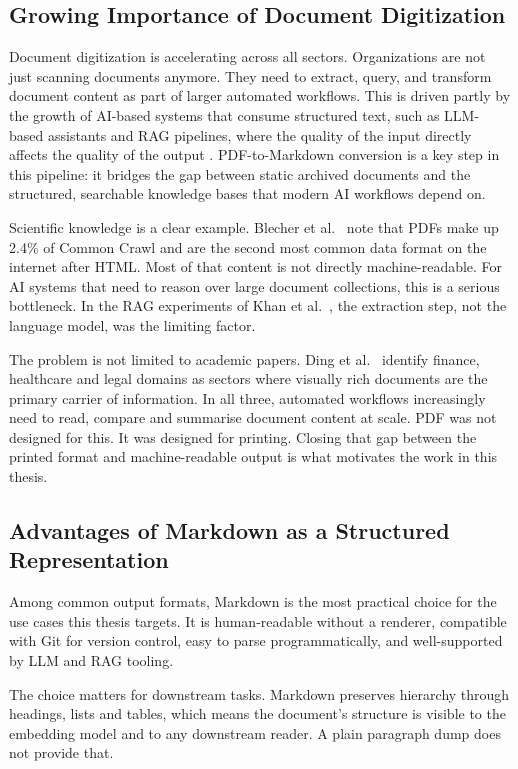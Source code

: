 \subsection{Growing Importance of Document Digitization}

Document digitization is accelerating across all sectors. Organizations are
not just scanning documents anymore. They need to extract, query, and
transform document content as part of larger automated workflows. This is
driven partly by the growth of AI-based systems that consume structured text,
such as LLM-based assistants and RAG pipelines, where the quality of the
input directly affects the quality of the output \autocite{khan2024}.
PDF-to-Markdown conversion is a key step in this pipeline: it bridges the
gap between static archived documents and the structured, searchable
knowledge bases that modern AI workflows depend on.

Scientific knowledge is a clear example. Blecher et al.\ \autocite{blecher2023}
note that PDFs make up 2.4\% of Common Crawl and are the second most
common data format on the internet after HTML. Most of that content is
not directly machine-readable. For AI systems that need to reason over large
document collections, this is a serious bottleneck. In the RAG experiments of
Khan et al.\ \autocite{khan2024}, the extraction step, not the language model,
was the limiting factor.

The problem is not limited to academic papers. Ding et al.\ \autocite{ding2026}
identify finance, healthcare and legal domains as sectors where visually rich
documents are the primary carrier of information. In all three, automated
workflows increasingly need to read, compare and summarise document content
at scale. PDF was not designed for this. It was designed for printing.
Closing that gap between the printed format and machine-readable output is
what motivates the work in this thesis.

\subsection{Advantages of Markdown as a Structured Representation}

Among common output formats, Markdown is the most practical choice for the
use cases this thesis targets. It is human-readable without a renderer,
compatible with Git for version control, easy to parse programmatically, and
well-supported by LLM and RAG tooling.

The choice matters for downstream tasks. Markdown preserves hierarchy through
headings, lists and tables, which means the document's structure is visible to
the embedding model and to any downstream reader. A plain paragraph dump does
not provide that.

